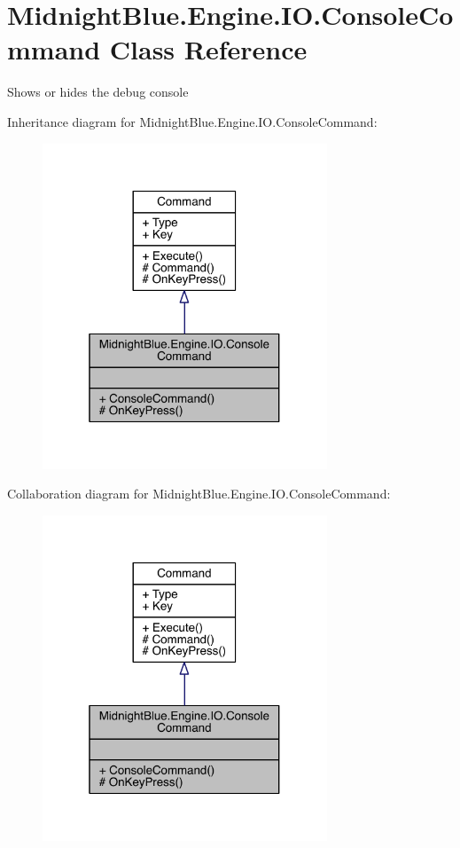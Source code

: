 \hypertarget{class_midnight_blue_1_1_engine_1_1_i_o_1_1_console_command}{}\section{Midnight\+Blue.\+Engine.\+I\+O.\+Console\+Command Class Reference}
\label{class_midnight_blue_1_1_engine_1_1_i_o_1_1_console_command}


Shows or hides the debug console  




Inheritance diagram for Midnight\+Blue.\+Engine.\+I\+O.\+Console\+Command\+:
\nopagebreak
\begin{figure}[H]
\begin{center}
\leavevmode
\includegraphics[width=241pt]{class_midnight_blue_1_1_engine_1_1_i_o_1_1_console_command__inherit__graph}
\end{center}
\end{figure}


Collaboration diagram for Midnight\+Blue.\+Engine.\+I\+O.\+Console\+Command\+:
\nopagebreak
\begin{figure}[H]
\begin{center}
\leavevmode
\includegraphics[width=241pt]{class_midnight_blue_1_1_engine_1_1_i_o_1_1_console_command__coll__graph}
\end{center}
\end{figure}

